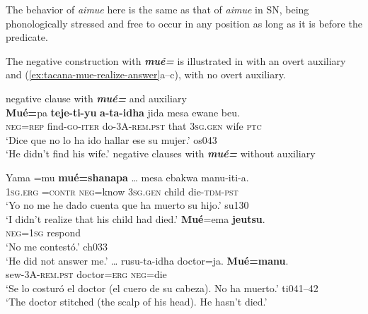 \documentclass[output=paper]{langsci/langscibook}
\begin{document}
The behavior of \textit{aimue} here is the same as that of \textit{aimue} in SN, being phonologically stressed and free to occur in any position as long as it is before the predicate.

The negative construction with \textbf{\textit{mué=}} is illustrated in
 with an overt auxiliary and
(\ref{ex:tacana-mue-realize-answer}a--c), with no overt auxiliary.

\begin{exe}\ex \label{ex:tacana-mueaux}  negative clause with
\textbf{\textit{mué=}} and auxiliary\\
\gll  \textbf{Mué=}pa \textbf{teje-ti-yu} \textbf{a-ta-idha}
\makebox[0pt][l]{\raisebox{\baselineskip}{O}}{\ob}jida mesa ewane{\cb} beu.\\
 \textsc{neg=rep}  find-\textsc{go-iter}  do\textsc{-3A-rem.pst}  that
 \textsc{3sg.gen}  wife  \textsc{ptc}\\
\glt `Dice que no lo ha ido hallar ese su mujer.' os043\\
`He didn't find his wife.'
\ex \label{ex:tacana-mue-realize-answer} negative clauses with
\textbf{\textit{mué=}} without auxiliary
\begin{xlist}
\ex\label{}
\gll  {}Yama  =mu
\textbf{mué=shanapa}
\ob\ldots{\cb} {\ob}mesa ebakwa{\cb} manu-iti-a.\\
\textsc{1sg.erg}  \textsc{=contr}  \textsc{neg}=know {} 3\textsc{sg.gen}
child die-\textsc{tdm-pst}\\
\glt `Yo no me he dado cuenta que ha muerto su hijo.' su130\\
`I didn't realize that his child had died.'
\ex\label{ex:tacana-mue-answer}
\gll {}\textbf{Mué}=ema
\textbf{jeutsu}.\\
    \textsc{neg=1sg} respond\\
\glt `No me contestó.' ch033\\
`He did not answer me.'
\ex\label{ex:tacana-mue-doctor}
\gll  \ldots{} rusu-ta-idha doctor=ja.
\textbf{Mué=manu}.\\
{}    sew-3A\textsc{-rem.pst}  doctor=\textsc{erg}  \textsc{neg}=die\\
\glt `Se lo costuró el doctor (el cuero de su cabeza). No ha muerto.'
ti041--42\\
`The doctor stitched (the scalp of his head). He hasn't died.'
\end{xlist}\end{exe}
\end{document}
